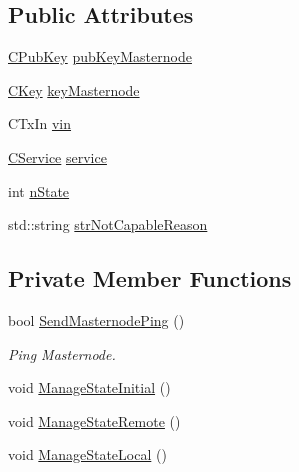 \subsection*{Public Attributes}
\begin{DoxyCompactItemize}
\item 
\mbox{\hyperlink{class_c_pub_key}{C\+Pub\+Key}} \mbox{\hyperlink{class_c_active_masternode_a005f6d9c1e40efd38ab5ceddcb56628b}{pub\+Key\+Masternode}}
\item 
\mbox{\hyperlink{class_c_key}{C\+Key}} \mbox{\hyperlink{class_c_active_masternode_ae5b082fbd8a6ba601f438935bd805c47}{key\+Masternode}}
\item 
C\+Tx\+In \mbox{\hyperlink{class_c_active_masternode_a0fe32edc638ebd2866dda14fd490d78e}{vin}}
\item 
\mbox{\hyperlink{class_c_service}{C\+Service}} \mbox{\hyperlink{class_c_active_masternode_a5b990857c9dc1005d0c134c608474c8f}{service}}
\item 
int \mbox{\hyperlink{class_c_active_masternode_acb6d8a990391957177788dfac0378453}{n\+State}}
\item 
std\+::string \mbox{\hyperlink{class_c_active_masternode_a80a068fb0e4fc1a77dabe501a806e460}{str\+Not\+Capable\+Reason}}
\end{DoxyCompactItemize}
\subsection*{Private Member Functions}
\begin{DoxyCompactItemize}
\item 
bool \mbox{\hyperlink{class_c_active_masternode_ad6f0db3dd4f896f2697601c9713f4434}{Send\+Masternode\+Ping}} ()
\begin{DoxyCompactList}\small\item\em Ping Masternode. \end{DoxyCompactList}\item 
void \mbox{\hyperlink{class_c_active_masternode_a02d5896f56c03a65f712796bd7b598e6}{Manage\+State\+Initial}} ()
\item 
void \mbox{\hyperlink{class_c_active_masternode_aefd004895e9c2ddff987a5d1b027b134}{Manage\+State\+Remote}} ()
\item 
void \mbox{\hyperlink{class_c_active_masternode_aec51e7862f3d6acfff08974f0063786a}{Manage\+State\+Local}} ()
\end{DoxyCompactItemize}
